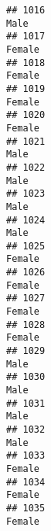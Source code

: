\documentclass[]{article}
\begin{document}
\begin{verbatim}
## 1016                                                                                                                            Male
## 1017                                                                                                                          Female
## 1018                                                                                                                          Female
## 1019                                                                                                                          Female
## 1020                                                                                                                          Female
## 1021                                                                                                                            Male
## 1022                                                                                                                            Male
## 1023                                                                                                                            Male
## 1024                                                                                                                            Male
## 1025                                                                                                                          Female
## 1026                                                                                                                          Female
## 1027                                                                                                                          Female
## 1028                                                                                                                          Female
## 1029                                                                                                                            Male
## 1030                                                                                                                            Male
## 1031                                                                                                                            Male
## 1032                                                                                                                            Male
## 1033                                                                                                                          Female
## 1034                                                                                                                          Female
## 1035                                                                                                                          Female

\end{verbatim}
\end{document}
